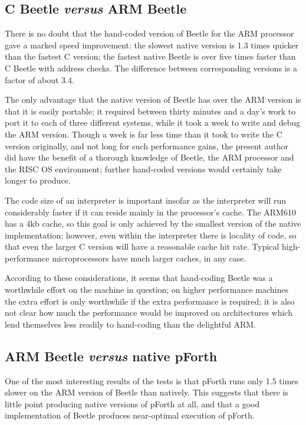 \documentclass{article}
\begin{document}
\subsection{C Beetle \textit{versus} ARM Beetle}

There is no doubt that the hand-coded version of Beetle for the ARM processor
gave a marked speed improvement: the slowest native version is 1.3 times
quicker than the fastest C version; the fastest native Beetle is over five
times faster than C Beetle with address checks. The difference between
corresponding versions is a factor of about 3.4.

The only advantage that the native version of Beetle has over the ARM version
is that it is easily portable; it required between thirty minutes and a day's
work to port it to each of three different systems, while it took a week to
write and debug the ARM version. Though a week is far less time than it took
to write the C version originally, and not long for such performance gains,
the present author did have the benefit of a thorough knowledge of Beetle,
the ARM processor and the RISC OS environment; further hand-coded versions
would certainly take longer to produce.

The code size of an interpreter is important insofar as the interpreter will
run considerably faster if it can reside mainly in the processor's cache. The
ARM610 has a 4kb cache, so this goal is only achieved by the smallest version
of the native implementation; however, even within the interpreter there is
locality of code, so that even the larger C version will have a reasonable
cache hit rate. Typical high-performance microprocessors have much larger
caches, in any case.

According to these considerations, it seems that hand-coding Beetle was a
worthwhile effort on the machine in question; on higher performance machines
the extra effort is only worthwhile if the extra performance is required; it
is also not clear how much the performance would be improved on architectures
which lend themselves less readily to hand-coding than the delightful ARM.

\subsection{ARM Beetle \textit{versus} native pForth}

One of the most interesting results of the tests is that pForth runs only 1.5
times slower on the ARM version of Beetle than natively. This suggests that
there is little point producing native versions of pForth at all, and that a
good implementation of Beetle produces near-optimal execution of pForth.
\end{document}

